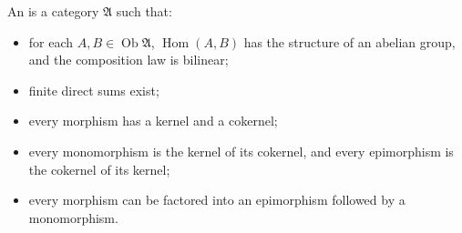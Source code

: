 An  is a category $\mathfrak{A}$ such that:
\begin{itemize}
\item for each $A, B \in \operatorname{Ob} \mathfrak{A}$, $\operatorname{Hom}(A,B)$ has the structure of an abelian group, and the composition law is bilinear;
\item finite direct sums exist;
\item every morphism has a kernel and a cokernel;
\item every monomorphism is the kernel of its cokernel, and every epimorphism is the cokernel of its kernel;
\item every morphism can be factored into an epimorphism followed by a monomorphism.
\end{itemize}
